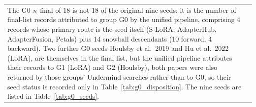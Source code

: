 \begin{table}[H]
\begin{tabular}{lp{4.4cm}rrrl}
\bottomrule
\multicolumn{6}{p{0.95\linewidth}}{\footnotesize The G0 \emph{n}~final of 18
is not 18 of the original nine seeds: it is the number of final-list records
attributed to group G0 by the unified pipeline, comprising 4 records whose
primary route is the seed itself (S-LoRA, AdapterHub, AdapterFusion, Petals)
plus 14 snowball descendants (10 forward, 4 backward). Two further G0 seeds
Houlsby et al.\ 2019 and Hu et al.\ 2022 (LoRA), are themselves in the
final list, but the unified pipeline attributes their records to G1 (LoRA) and
G2 (Houlsby), both papers were also returned by those groups' Undermind
searches rather than to G0, so their seed status is recorded only in
Table~\ref{tab:g0_disposition}. The nine seeds are listed in
Table~\ref{tab:g0_seeds}.} \\
\end{tabular}
\end{table}

